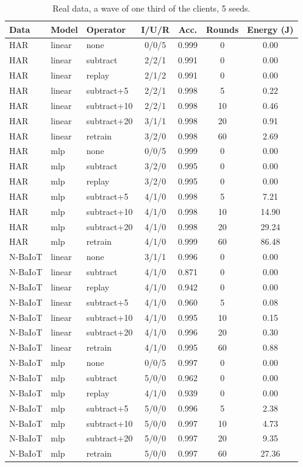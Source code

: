 \begin{table}[h]
\centering
\caption{Real data, a wave of one third of the clients, 5 seeds.}\label{tab:s_real}
\footnotesize
\setlength{\tabcolsep}{3pt}
\begin{tabular}{@{}lllcccc@{}}
\toprule
Data & Model & Operator & I/U/R & Acc. & Rounds & Energy (J) \\
\midrule
HAR & linear & none & 0/0/5 & 0.999 & 0 & 0.00 \\
HAR & linear & subtract & 2/2/1 & 0.991 & 0 & 0.00 \\
HAR & linear & replay & 2/1/2 & 0.991 & 0 & 0.00 \\
HAR & linear & subtract+5 & 2/2/1 & 0.998 & 5 & 0.22 \\
HAR & linear & subtract+10 & 2/2/1 & 0.998 & 10 & 0.46 \\
HAR & linear & subtract+20 & 3/1/1 & 0.998 & 20 & 0.91 \\
HAR & linear & retrain & 3/2/0 & 0.998 & 60 & 2.69 \\
HAR & mlp & none & 0/0/5 & 0.999 & 0 & 0.00 \\
HAR & mlp & subtract & 3/2/0 & 0.995 & 0 & 0.00 \\
HAR & mlp & replay & 3/2/0 & 0.995 & 0 & 0.00 \\
HAR & mlp & subtract+5 & 4/1/0 & 0.998 & 5 & 7.21 \\
HAR & mlp & subtract+10 & 4/1/0 & 0.998 & 10 & 14.90 \\
HAR & mlp & subtract+20 & 4/1/0 & 0.998 & 20 & 29.24 \\
HAR & mlp & retrain & 4/1/0 & 0.999 & 60 & 86.48 \\
N-BaIoT & linear & none & 3/1/1 & 0.996 & 0 & 0.00 \\
N-BaIoT & linear & subtract & 4/1/0 & 0.871 & 0 & 0.00 \\
N-BaIoT & linear & replay & 4/1/0 & 0.942 & 0 & 0.00 \\
N-BaIoT & linear & subtract+5 & 4/1/0 & 0.960 & 5 & 0.08 \\
N-BaIoT & linear & subtract+10 & 4/1/0 & 0.995 & 10 & 0.15 \\
N-BaIoT & linear & subtract+20 & 4/1/0 & 0.996 & 20 & 0.30 \\
N-BaIoT & linear & retrain & 4/1/0 & 0.995 & 60 & 0.88 \\
N-BaIoT & mlp & none & 0/0/5 & 0.997 & 0 & 0.00 \\
N-BaIoT & mlp & subtract & 5/0/0 & 0.962 & 0 & 0.00 \\
N-BaIoT & mlp & replay & 4/1/0 & 0.939 & 0 & 0.00 \\
N-BaIoT & mlp & subtract+5 & 5/0/0 & 0.996 & 5 & 2.38 \\
N-BaIoT & mlp & subtract+10 & 5/0/0 & 0.997 & 10 & 4.73 \\
N-BaIoT & mlp & subtract+20 & 5/0/0 & 0.997 & 20 & 9.35 \\
N-BaIoT & mlp & retrain & 5/0/0 & 0.997 & 60 & 27.36 \\
\bottomrule
\end{tabular}
\end{table}


